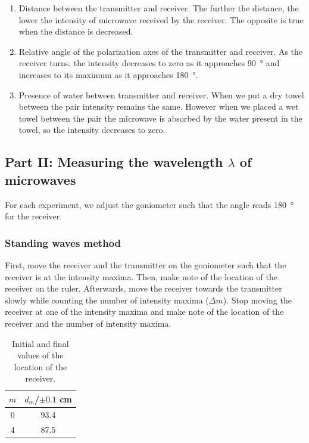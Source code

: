 \documentclass[letter,12pt]{article}
\newcommand{\tlambda}{\(\lambda\) }
\numberwithin{equation}{section}
\numberwithin{figure}{section}
\numberwithin{table}{section}
\begin{document}
\begin{enumerate}
  \item Distance between the transmitter and receiver. The further the distance, the lower the intensity of microwave received by the receiver. The opposite is true when the distance is decreased.
  \item Relative angle of the polarization axes of the transmitter and receiver. As the receiver turns, the intensity decreases to zero as it approaches \SI{90}{\degree} and increases to its maximum as it approaches \SI{180}{\degree}.
  \item Presence of water between transmitter and receiver. When we put a dry towel between the pair intensity remains the same. However when we placed a wet towel between the pair the microwave is absorbed by the water present in the towel, so the intensity decreases to zero.
\end{enumerate}

\subsection{Part II: Measuring the wavelength \tlambda of microwaves}
For each experiment, we adjust the goniometer such that the angle reads \SI{180}{\degree} for the receiver.

\subsubsection{Standing waves method}
First, move the receiver and the transmitter on the goniometer such that the receiver is at the intensity maxima. Then, make note of the location of the receiver on the ruler. Afterwards, move the receiver towards the transmitter slowly while counting the number of intensity maxima (\(\Delta m\)). Stop moving the receiver at one of the intensity maxima and make note of the location of the receiver and the number of intensity maxima.

\begin{table}[!ht]
  \centering
  \begin{tabular}{cc}
    \toprule
    {\(m\)} & {\(d_m\)/\(\pm 0.1\) \si{\cm}} \\ \midrule
    0 & 93.4 \\
    4 & 87.5 \\
    \bottomrule
  \end{tabular}
  \caption{Initial and final values of the location of the receiver.}
  \label{table:e1}
\end{table}
\end{document}
